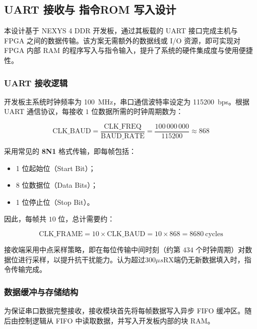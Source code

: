\documentclass[lang=cn,a4paper,newtx]{elegantpaper}
\begin{document}


\subsection{UART 接收与 指令ROM 写入设计}

本设计基于 NEXYS 4 DDR 开发板，通过其板载的 UART 接口完成主机与 FPGA 之间的数据传输。该方案无需额外的数据线或 I/O 资源，即可实现对 FPGA 内部 RAM 的程序写入与指令输入，提升了系统的硬件集成度与使用便捷性。

\subsubsection{UART 接收逻辑}

开发板主系统时钟频率为 \SI{100}{\mega\hertz}，串口通信波特率设定为 \SI{115200}{bps}。根据 UART 通信协议，每接收 $1$ 位数据所需的时钟周期数为：

\begin{equation}
  \text{CLK\_BAUD} = \frac{\text{CLK\_FREQ}}{\text{BAUD\_RATE}} = \frac{100\,000\,000}{115200} \approx 868
\end{equation}

采用常见的 \textbf{8N1} 格式传输，即每帧包括：

\begin{itemize}
  \item 1 位起始位（Start Bit）；
  \item 8 位数据位（Data Bits）；
  \item 1 位停止位（Stop Bit）。
\end{itemize}

因此，每帧共 $10$ 位，总计需要约：

\begin{equation}
  \text{CLK\_FRAME} = 10 \times \text{CLK\_BAUD} = 10 \times 868 = 8680\ \text{cycles}
\end{equation}

接收端采用中点采样策略，即在每位传输中间时刻（约第 $434$ 个时钟周期）对数据位进行采样，以提升抗干扰能力。认为超过300$\mu s$RX端仍无新数据填入时，指令传输完成。

\subsubsection{数据缓冲与存储结构}

为保证串口数据完整接收，接收模块首先将每帧数据写入异步 FIFO 缓冲区。随后由控制逻辑从 FIFO 中读取数据，并写入开发板内部的块 RAM。
\end{document}
